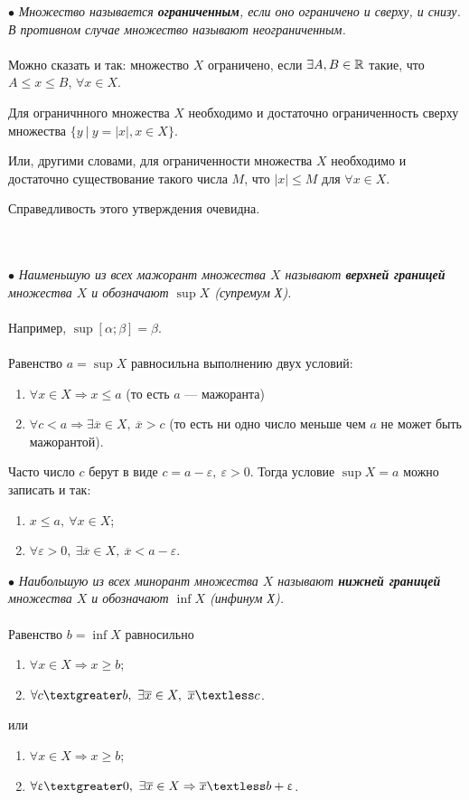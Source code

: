 $\bullet$ \textit{Множество называется \textbf{ограниченным}, если оно ограничено и сверху, и снизу. В противном случае множество называют неограниченным.}\\\\
Можно сказать и так: множество $X$ ограничено, если $\exists A, B \in \mathbb{R}$ такие, что $A\leqslant x\leqslant B$, $\forall x \in X$. 
\begin{theorem}
	Для ограничнного множества $X$ необходимо и достаточно ограниченность сверху множества $\{ y\ |\ y = |x|, x \in X\}$.
\end{theorem}
Или, другими словами, для ограниченности множества $X$ необходимо и достаточно существование такого числа $M$, что $|x| \leqslant M$ для $\forall x \in X$.\\
\begin{Proof}
	Справедливость этого утверждения очевидна.
\end{Proof}\\\\
$\bullet$ \textit{Наименьшую из всех мажорант множества $X$ называют \textbf{верхней границей} множества $X$ и обозначают $\sup X$ (супремум Х).}\\\\
Например, $\sup [\alpha; \beta] = \beta$.\\\\
Равенство $a = \sup X$ равносильна выполнению двух условий:
\begin{enumerate}
	\item $\forall x \in X \Rightarrow x \leqslant a$ (то есть $a$ --- мажоранта)
	\item $\forall c < a \Rightarrow \exists \overline{x} \in X,\ \overline{x} > c$ (то есть ни одно число меньше чем $a$ не может быть мажорантой).
\end{enumerate}
Часто число $c$ берут в виде $c = a - \varepsilon,\ \varepsilon > 0$. Тогда условие $\sup X = a$ можно записать и так:
\begin{enumerate}
	\item $x \leqslant a,\ \forall x \in X$;
	\item $\forall \varepsilon > 0,\ \exists \overline{x} \in X,\ \overline{x} < a - \varepsilon$.
\end{enumerate}
$\bullet$ \textit{Наибольшую из всех минорант множества $X$ называют \textbf{нижней границей} множества $X$ и обозначают $\inf X$ (инфинум Х).}\\\\
Равенство $b = \inf X$ равносильно
\begin{enumerate}
	\item $\forall x \in X \Rightarrow x \geqslant b$;
	\item $\forall c \textgreater b,\ \exists \overline{x} \in X,\ \overline{x} \textless c$.
\end{enumerate}
или
\begin{enumerate}
	\item $\forall x \in X \Rightarrow x \geqslant b$;
	\item $\forall \varepsilon \textgreater 0,\ \exists \overline{x} \in X \Rightarrow \overline{x} \textless b + \varepsilon$.
\end{enumerate}
